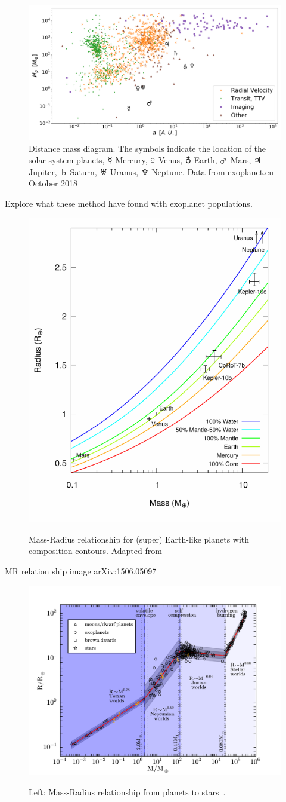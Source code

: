 \begin{figure}
    \centering
    \includegraphics[width=0.\linewidth]{./figures/introduction/exoplanetEU_a_mass.pdf}
    \caption{Distance mass diagram.
        The symbols indicate the location of the solar system planets, $\mercury$-Mercury, $\venus$-Venus, $\earth$-Earth, $\mars$-Mars, $\jupiter$-Jupiter, $\saturn$-Saturn, $\uranus$-Uranus, $\neptune$-Neptune.
        Data from \href{http://ww.exoplanet.eu}{exoplanet.eu} October 2018}
    \label{fig:pltoverlayadd}
\end{figure}


Explore what these method have found with exoplanet populations.


\begin{figure}[t]
    \centering
    \includegraphics[width=0.4\linewidth]{./figures/introduction/Mass_radius_relation-compostion_Brugger_2017.pdf}\\
    \caption{Mass-Radius relationship for (super) Earth-like planets with composition contours.
        Adapted from~\citet{brugger_constraints_2017}}
    \label{fig:mass_radius_relation_composition}
\end{figure}

MR relation ship image arXiv:1506.05097~\citet{chen_probabilistic_2016}

\begin{figure}[t]
    \centering
    \includegraphics[width=0.9\linewidth]{./figures/introduction/mass_radius_relation.pdf}  \\
    \caption{Left: Mass-Radius relationship from planets to stars~\citet{chen_probabilistic_2016}.}
    \label{fig:mass_radius_relation}
\end{figure}


